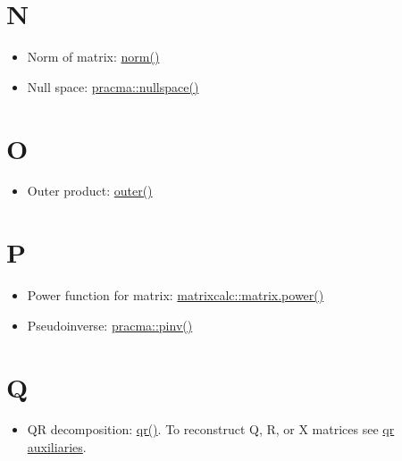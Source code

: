 \documentclass[
]{book}
\providecommand{\tightlist}{%
  \setlength{\itemsep}{0pt}\setlength{\parskip}{0pt}}
\begin{document}
\hypertarget{n}{%
\section*{N}\label{n}}

\begin{itemize}
\tightlist
\item
  Norm of matrix: \href{https://stat.ethz.ch/R-manual/R-patched/library/base/html/norm.html}{norm()}
\item
  Null space: \href{https://rdrr.io/rforge/pracma/man/nullspace.html}{pracma::nullspace()}
\end{itemize}

\hypertarget{o}{%
\section*{O}\label{o}}

\begin{itemize}
\tightlist
\item
  Outer product: \href{https://stat.ethz.ch/R-manual/R-patched/library/base/html/outer.html}{outer()}
\end{itemize}

\hypertarget{p}{%
\section*{P}\label{p}}

\begin{itemize}
\tightlist
\item
  Power function for matrix: \href{https://www.rdocumentation.org/packages/matrixcalc/versions/1.0-3/topics/matrix.power}{matrixcalc::matrix.power()}
\item
  Pseudoinverse: \href{https://rdrr.io/cran/pracma/man/pinv.html}{pracma::pinv()}
\end{itemize}

\hypertarget{q}{%
\section*{Q}\label{q}}

\begin{itemize}
\tightlist
\item
  QR decomposition: \href{https://stat.ethz.ch/R-manual/R-devel/library/base/html/qr.html}{qr()}. To reconstruct Q, R, or X matrices see \href{https://stat.ethz.ch/R-manual/R-devel/library/base/html/qraux.html}{qr auxiliaries}.
\end{itemize}
\end{document}
